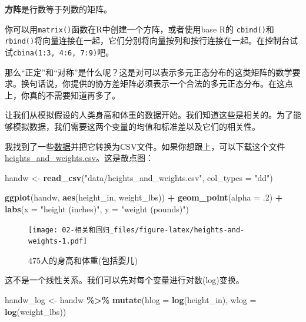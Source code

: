 \documentclass[
]{book}
\newenvironment{Shaded}{\begin{snugshade}}{\end{snugshade}}
\newcommand{\AttributeTok}[1]{\textcolor[rgb]{0.13,0.29,0.53}{#1}}
\newcommand{\DecValTok}[1]{\textcolor[rgb]{0.00,0.00,0.81}{#1}}
\newcommand{\FunctionTok}[1]{\textcolor[rgb]{0.13,0.29,0.53}{\textbf{#1}}}
\newcommand{\NormalTok}[1]{#1}
\newcommand{\OtherTok}[1]{\textcolor[rgb]{0.56,0.35,0.01}{#1}}
\newcommand{\SpecialCharTok}[1]{\textcolor[rgb]{0.81,0.36,0.00}{\textbf{#1}}}
\newcommand{\StringTok}[1]{\textcolor[rgb]{0.31,0.60,0.02}{#1}}
\begin{document}
\textbf{方阵}是行数等于列数的矩阵。

你可以用\texttt{matrix()}函数在R中创建一个方阵，或者使用base R的 \texttt{cbind()}和\texttt{rbind()}将向量连接在一起，它们分别将向量按列和按行连接在一起。在控制台试试\texttt{cbina(1:3,\ 4:6,\ 7:9)}吧。

那么``正定''和``对称''是什么呢？这是对可以表示多元正态分布的这类矩阵的数学要求。换句话说，你提供的协方差矩阵必须表示一个合法的多元正态分布。在这点上，你真的不需要知道再多了。

让我们从模拟假设的人类身高和体重的数据开始。我们知道这些是相关的。为了能够模拟数据，我们需要这两个变量的均值和标准差以及它们的相关性。

我找到了一些\href{https://www.geogebra.org/m/RRprACv4}{数据}并把它转换为CSV文件。如果你想跟上，可以下载这个文件\href{data/heights_and_weights.csv}{heights\_and\_weights.csv}。这是散点图：

\begin{Shaded}
\begin{Highlighting}[]
\NormalTok{handw }\OtherTok{\textless{}{-}} \FunctionTok{read\_csv}\NormalTok{(}\StringTok{"data/heights\_and\_weights.csv"}\NormalTok{, }\AttributeTok{col\_types =} \StringTok{"dd"}\NormalTok{)}

\FunctionTok{ggplot}\NormalTok{(handw, }\FunctionTok{aes}\NormalTok{(height\_in, weight\_lbs)) }\SpecialCharTok{+} 
  \FunctionTok{geom\_point}\NormalTok{(}\AttributeTok{alpha =}\NormalTok{ .}\DecValTok{2}\NormalTok{) }\SpecialCharTok{+}
  \FunctionTok{labs}\NormalTok{(}\AttributeTok{x =} \StringTok{"height (inches)"}\NormalTok{, }\AttributeTok{y =} \StringTok{"weight (pounds)"}\NormalTok{) }
\end{Highlighting}
\end{Shaded}

\begin{figure}
\centering
\texttt{[image: 02-相关和回归\_files/figure-latex/heights-and-weights-1.pdf]}
\caption{\label{fig:heights-and-weights}475人的身高和体重(包括婴儿)}
\end{figure}

这不是一个线性关系。我们可以先对每个变量进行对数(log)变换。

\begin{Shaded}
\begin{Highlighting}[]
\NormalTok{handw\_log }\OtherTok{\textless{}{-}}\NormalTok{ handw }\SpecialCharTok{\%\textgreater{}\%}
  \FunctionTok{mutate}\NormalTok{(}\AttributeTok{hlog =} \FunctionTok{log}\NormalTok{(height\_in),}
         \AttributeTok{wlog =} \FunctionTok{log}\NormalTok{(weight\_lbs))}
\end{Highlighting}
\end{Shaded}
\end{document}
